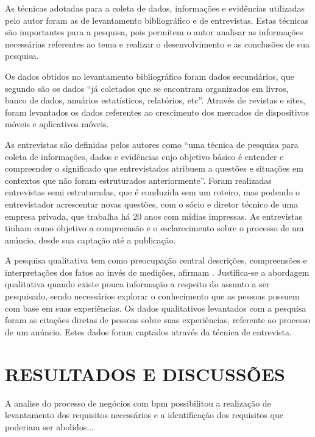 \documentclass[
	12pt,				%
	openright,			%
	oneside,			%
	a4paper,			%
	chapter=TITLE,		%
	section=TITLE,		%
	english,			%
	french,				%
	spanish,			%
	brazil				%
	]{abntex2}
\begin{document}
As técnicas adotadas para a coleta de dados, informações e evidências utilizadas pelo autor foram as de levantamento bibliográfico e de entrevistas. Estas técnicas são importantes para a pesquisa, pois permitem o autor analisar as informações necessárias referentes ao tema e realizar o desenvolvimento e as conclusões de sua pesquisa.

Os dados obtidos no levantamento bibliográfico foram dados secundários, que segundo  são os dados “já coletados que se encontram organizados em livros, banco de dados, anuários estatísticos, relatórios, etc”. Através de revistas e sites, foram levantados os dados referentes ao crescimento dos mercados de dispositivos móveis e aplicativos móveis.

As entrevistas são definidas pelos autores  como “uma técnica de pesquisa para coleta de informações, dados e evidências cujo objetivo básico é entender e compreender o significado que entrevistados atribuem a questões e situações em contextos que não foram estruturados anteriormente”. Foram realizadas entrevistas semi estruturadas, que é conduzida sem um roteiro, mas podendo o entrevistador acrescentar novas questões, com o sócio e diretor técnico de uma empresa privada, que trabalha há 20 anos com mídias impressas. As entrevistas tinham como objetivo a compreensão e o esclarecimento sobre o processo de um anúncio, desde sua captação até a publicação.

A pesquisa qualitativa tem como preocupação central descrições, compreensões e interpretações dos fatos ao invés de medições, afirmam . Justifica-se a abordagem qualitativa quando existe pouca informação a respeito do assunto a ser pesquisado, sendo necessários explorar o conhecimento que as pessoas possuem com base em suas experiências. Os dados qualitativos levantados com a pesquisa foram as citações diretas de pessoas sobre suas experiências, referente ao processo de um anúncio. Estes dados foram captados através da técnica de entrevista.


\chapter{RESULTADOS E DISCUSSÕES}

A analise do processo de negócios com bpm possibilitou a realização de levantamento dos requisitos necessários e a identificação dos requisitos que poderiam ser abolidos...
\end{document}
